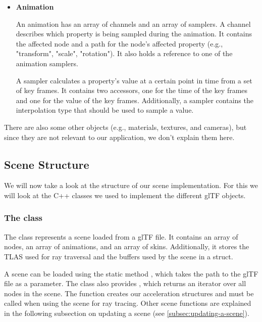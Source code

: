 \begin{itemize}
    \item \textbf{Animation}

    An animation has an array of channels and an array of samplers. A channel describes which property is being sampled during the animation. It contains the affected node and a path for the node's affected property (e.g., "transform", "scale", "rotation"). It also holds a reference to one of the animation samplers. 

    A sampler calculates a property's value at a certain point in time from a set of key frames. It contains two accessors, one for the time of the key frames and one for the value of the key frames. Additionally, a sampler contains the interpolation type that should be used to sample a value.


\end{itemize}

There are also some other objects (e.g., materials, textures, and cameras), but since they are not relevant to our application, we don't explain them here.

\subsection{Scene Structure}

We will now take a look at the structure of our scene implementation. For this we will look at the C++ classes we used to implement the different glTF objects.


\subsubsection{The  class}

The  class represents a scene loaded from a glTF file. It contains an array of nodes, an array of animations, and an array of skins. Additionally, it stores the TLAS used for ray traversal and the buffers used by the scene in a  struct.

A scene can be loaded using the static method , which takes the path to the glTF file as a parameter. The class also provides , which returns an iterator over all nodes in the scene. The function  creates our acceleration structures and must be called when using the scene for ray tracing. Other scene functions are explained in the following subsection on updating a scene (see \autoref{subsec:updating-a-scene}).

